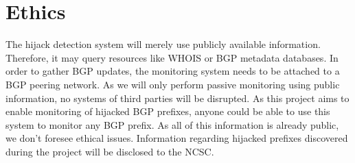 \section{Ethics}
The hijack detection system will merely use publicly available information. Therefore, it may query resources like WHOIS or BGP metadata databases. In order to gather BGP updates, the monitoring system needs to be attached to a BGP peering network. As we will only perform passive monitoring using public information, no systems of third parties will be disrupted. As this project aims to enable monitoring of hijacked BGP prefixes, anyone could be able to use this system to monitor any BGP prefix. As all of this information is already public, we don't foresee ethical issues. Information regarding hijacked prefixes discovered during the project will be disclosed to the NCSC.
